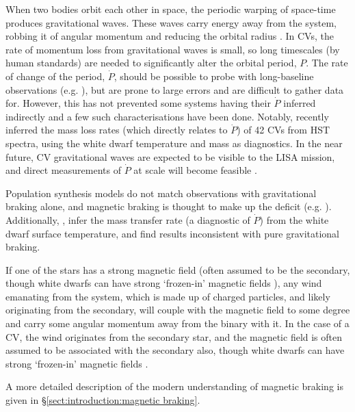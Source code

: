 When two bodies orbit each other in space, the periodic warping of space-time produces gravitational waves. These waves carry energy away from the system, robbing it of angular momentum and reducing the orbital radius \citep{Paczynski1967}. In CVs, the rate of momentum loss from gravitational waves is small, so long timescales (by human standards) are needed to significantly alter the orbital period, $P$.
The rate of change of the period, $\dot P$, should be possible to probe with long-baseline observations (e.g. \citealt{qian2007, shafter2021}), but are prone to large errors and are difficult to gather data for. However, this has not prevented some systems having their $\dot P$ inferred indirectly and a few such characterisations have been done. Notably, \citet{pala2020} recently inferred the mass loss rates (which directly relates to $\dot P$) of 42 CVs from HST spectra, using the white dwarf temperature and mass as diagnostics. 
In the near future, CV gravitational waves are expected to be visible to the LISA mission, and direct measurements of $\dot P$ at scale will become feasible \citep{Meliani2000, kalomeni2016}. 

Population synthesis models do not match observations with gravitational braking alone, and magnetic braking is thought to make up the deficit (e.g. \citet{kolb1993a, kolb1993, Davis2008, garraffo2018}).
Additionally, \citet{Townsley2009}, \citet{Pala2021} infer the mass transfer rate (a diagnostic of $\dot P$) from the white dwarf surface temperature, and find results inconsistent with pure gravitational braking.

If one of the stars has a strong magnetic field (often assumed to be the secondary, though white dwarfs can have strong `frozen-in' magnetic fields \citep{TOUT2011}), any wind emanating from the system, which is made up of charged particles, and likely originating from the secondary, will couple with the magnetic field to some degree and carry some angular momentum away from the binary with it.
In the case of a CV, the wind originates from the secondary star, and the magnetic field is often assumed to be associated with the secondary also, though white dwarfs can have strong `frozen-in' magnetic fields \citep{TOUT2011}.

A more detailed description of the modern understanding of magnetic braking is given in \S\ref{sect:introduction:magnetic braking}.



